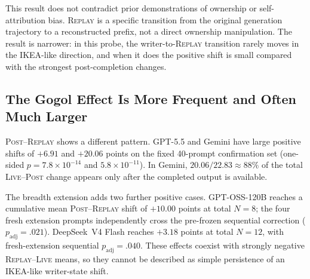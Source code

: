 \documentclass[10pt]{article}
\newcommand{\live}{\textsc{Live}}
\newcommand{\replay}{\textsc{Replay}}
\newcommand{\post}{\textsc{Post}}
\newcommand{\papersubsection}[1]{\Needspace{3.8\baselineskip}\subsection{#1}}
\begin{document}
This result does not contradict prior demonstrations of ownership or self-attribution bias. \replay{} is a specific transition from the original generation trajectory to a reconstructed prefix, not a direct ownership manipulation. The result is narrower: in this probe, the writer-to-\replay{} transition rarely moves in the IKEA-like direction, and when it does the positive shift is small compared with the strongest post-completion changes.

\begin{table}[t]
\centering
\small
\setlength{\tabcolsep}{4.0pt}
\caption{\live{}--\replay{}--\post{} decomposition across six models. $R-L>0$ is IKEA-like; $P-R>0$ is the Gogol direction. $N$ is the number of prompts with complete decomposition used for that model. The four breadth-extension sample sizes are adaptive; see text.}
\label{tab:six-model}
\end{table}

\papersubsection{The Gogol Effect Is More Frequent and Often Much Larger}
\post{}--\replay{} shows a different pattern. GPT-5.5 and Gemini have large positive shifts of $+6.91$ and $+20.06$ points on the fixed 40-prompt confirmation set (one-sided $p=7.8\times10^{-14}$ and $5.8\times10^{-11}$). In Gemini, $20.06/22.83\approx88\%$ of the total \live{}--\post{} change appears only after the completed output is available.

The breadth extension adds two further positive cases. GPT-OSS-120B reaches a cumulative mean \post{}--\replay{} shift of $+10.00$ points at total $N=8$; the four fresh extension prompts independently cross the pre-frozen sequential correction ($p_{\mathrm{adj}}=.021$). DeepSeek~V4 Flash reaches $+3.18$ points at total $N=12$, with fresh-extension sequential $p_{\mathrm{adj}}=.040$. These effects coexist with strongly negative \replay{}--\live{} means, so they cannot be described as simple persistence of an IKEA-like writer-state shift.
\end{document}
